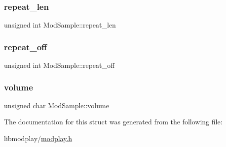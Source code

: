 \mbox{\label{structModSample_a1426ae72bf07dacde5539181b18ea001}} 
\subsubsection{\texorpdfstring{repeat\+\_\+len}{repeat\_len}}
{\footnotesize\ttfamily unsigned int Mod\+Sample\+::repeat\+\_\+len}

\mbox{\label{structModSample_aa2222ff52c86152fc631171db9113290}} 
\subsubsection{\texorpdfstring{repeat\+\_\+off}{repeat\_off}}
{\footnotesize\ttfamily unsigned int Mod\+Sample\+::repeat\+\_\+off}

\mbox{\label{structModSample_a4162e3c9eb5e2a13fd90f871fc2d950e}} 
\subsubsection{\texorpdfstring{volume}{volume}}
{\footnotesize\ttfamily unsigned char Mod\+Sample\+::volume}



The documentation for this struct was generated from the following file\+:\begin{DoxyCompactItemize}
\item 
libmodplay/\hyperlink{modplay_8h}{modplay.\+h}\end{DoxyCompactItemize}

